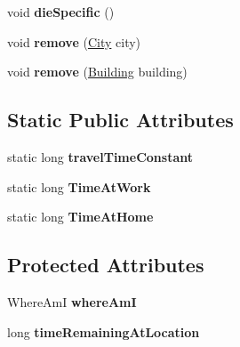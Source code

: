\begin{DoxyCompactItemize}
\item 
void {\bfseries die\+Specific} ()\hypertarget{classpeople_1_1cityworkers_1_1_city_worker_a81a74d2fdb17445f937d03ee337586ed}{}\label{classpeople_1_1cityworkers_1_1_city_worker_a81a74d2fdb17445f937d03ee337586ed}

\item 
void {\bfseries remove} (\hyperlink{classcities_1_1_city}{City} city)\hypertarget{classpeople_1_1cityworkers_1_1_city_worker_af8876df5dfaaaa85a7dcc973bcc1e17f}{}\label{classpeople_1_1cityworkers_1_1_city_worker_af8876df5dfaaaa85a7dcc973bcc1e17f}

\item 
void {\bfseries remove} (\hyperlink{classbuildings_1_1_building}{Building} building)\hypertarget{classpeople_1_1cityworkers_1_1_city_worker_a7b8eb66a53f543da5dcb91f6459f0db1}{}\label{classpeople_1_1cityworkers_1_1_city_worker_a7b8eb66a53f543da5dcb91f6459f0db1}

\end{DoxyCompactItemize}
\subsection*{Static Public Attributes}
\begin{DoxyCompactItemize}
\item 
static long {\bfseries travel\+Time\+Constant}\hypertarget{classpeople_1_1cityworkers_1_1_city_worker_aa487ade4f505fb7c8bc6a4db83e47075}{}\label{classpeople_1_1cityworkers_1_1_city_worker_aa487ade4f505fb7c8bc6a4db83e47075}

\item 
static long {\bfseries Time\+At\+Work}\hypertarget{classpeople_1_1cityworkers_1_1_city_worker_a89a2bb6de0dc91331568118abbfa1fb5}{}\label{classpeople_1_1cityworkers_1_1_city_worker_a89a2bb6de0dc91331568118abbfa1fb5}

\item 
static long {\bfseries Time\+At\+Home}\hypertarget{classpeople_1_1cityworkers_1_1_city_worker_a7093a812f59503ee781384518fbbfb89}{}\label{classpeople_1_1cityworkers_1_1_city_worker_a7093a812f59503ee781384518fbbfb89}

\end{DoxyCompactItemize}
\subsection*{Protected Attributes}
\begin{DoxyCompactItemize}
\item 
Where\+AmI {\bfseries where\+AmI}\hypertarget{classpeople_1_1cityworkers_1_1_city_worker_a4ff843d49b84121cf082b8bb9004c559}{}\label{classpeople_1_1cityworkers_1_1_city_worker_a4ff843d49b84121cf082b8bb9004c559}

\item 
long {\bfseries time\+Remaining\+At\+Location}\hypertarget{classpeople_1_1cityworkers_1_1_city_worker_a92f3618157a3f99ec09a551480007e18}{}\label{classpeople_1_1cityworkers_1_1_city_worker_a92f3618157a3f99ec09a551480007e18}

\end{DoxyCompactItemize}
